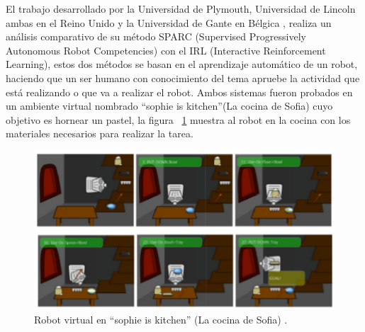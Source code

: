 El trabajo desarrollado por la Universidad de Plymouth, Universidad de
 Lincoln ambas en el Reino Unido y la Universidad de Gante en B\'elgica
 \cite{Senft2016}, realiza un an\'alisis comparativo de su m\'etodo SPARC (Supervised
 Progressively Autonomous Robot Competencies) con el IRL (Interactive
 Reinforcement Learning), estos dos m\'etodos se basan en el aprendizaje 
 autom\'atico de un robot, haciendo que un ser humano con conocimiento del tema
 apruebe la actividad que est\'a realizando o que va a realizar el robot.
 Ambos sistemas fueron probados en un ambiente virtual nombrado ``sophie is
 kitchen''(La cocina de Sofia) cuyo objetivo es hornear un pastel, 
 la figura ~\ref{fig:sparcrob} muestra al robot en la cocina con los materiales
 necesarios para realizar la tarea. 
 
\begin{figure}[h]
\centering
\includegraphics[width=0.8\columnwidth]{chap2/Imagenes/Sparc.eps}
\caption{Robot virtual en ``sophie is kitchen'' (La cocina de Sofia) 
 \cite{Senft2016}.}
\label{fig:sparcrob}
\end{figure}